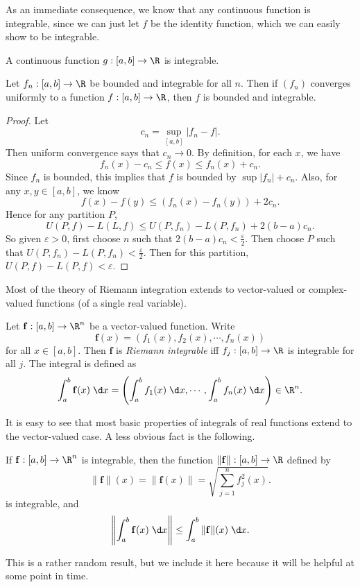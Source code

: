 \documentclass[a4paper]{article}
\begin{document}
As an immediate consequence, we know that any continuous function is integrable, since we can just let $f$ be the identity function, which we can easily show to be integrable.

\begin{cor}
  A continuous function $g:[a, b] \to \R$ is integrable.
\end{cor}

\begin{thm}
  Let $f_n: [a, b] \to \R$ be bounded and integrable for all $n$. Then if $(f_n)$ converges uniformly to a function $f: [a ,b] \to \R$, then $f$ is bounded and integrable.
\end{thm}

\begin{proof}
  Let
  \[
    c_n = \sup_{[a, b]} |f_n - f|.
  \]
  Then uniform convergence says that $c_n \to 0$. By definition, for each $x$, we have
  \[
    f_n(x) - c_n \leq f(x) \leq f_n(x) + c_n.
  \]
  Since $f_n$ is bounded, this implies that $f$ is bounded by $\sup |f_n| + c_n$. Also, for any $x, y\in [a, b]$, we know
  \[
    f(x) - f(y) \leq (f_n(x) - f_n(y)) + 2 c_n.
  \]
  Hence for any partition $P$,
  \[
    U(P, f) - L(L, f) \leq U(P, f_n) - L(P, f_n) + 2(b - a) c_n.
  \]
  So given $\varepsilon > 0$, first choose $n$ such that $2(b - a) c_n < \frac{\varepsilon}{2}$. Then choose $P$ such that $U(P, f_n) - L(P, f_n) < \frac{\varepsilon}{2}$. Then for this partition, $U(P, f) - L(P, f) < \varepsilon$.
\end{proof}

Most of the theory of Riemann integration extends to vector-valued or complex-valued functions (of a single real variable).
\begin{defi}
  Let $\mathbf{f}: [a, b] \to \R^n$ be a vector-valued function. Write
  \[
    \mathbf{f}(x) = (f_1(x), f_2(x), \cdots, f_n(x))
  \]
  for all $x\in [a, b]$. Then $\mathbf{f}$ is \emph{Riemann integrable} iff $f_j: [a, b] \to \R$ is integrable for all $j$. The integral is defined as
  \[
    \int_a^b \mathbf{f}(x)\;\d x = \left(\int_a^b f_1(x)\;\d x, \cdots, \int_a^b f_n(x)\;\d x\right) \in \R^n.
  \]
\end{defi}
It is easy to see that most basic properties of integrals of real functions extend to the vector-valued case. A less obvious fact is the following.
\begin{prop}
  If $\mathbf{f}: [a, b] \to \R^n$ is integrable, then the function $\|\mathbf{f}\|: [a, b] \to \R$ defined by
  \[
    \|\mathbf{f}\|(x) = \|\mathbf{f}(x)\| = \sqrt{\sum_{j = 1}^n f_j^2(x)}.
  \]
  is integrable, and
  \[
    \left\|\int_a^b \mathbf{f}(x)\;\d x\right\| \leq \int_a^b \|\mathbf{f}\|(x)\;\d x.
  \]
\end{prop}
This is a rather random result, but we include it here because it will be helpful at some point in time.
\end{document}
